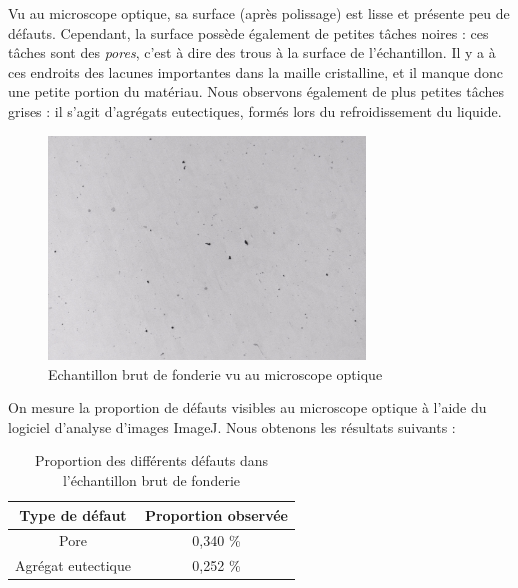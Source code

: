 Vu au microscope optique, sa surface (après polissage) est lisse
et présente peu de défauts. Cependant, la surface possède 
également de petites tâches noires : ces tâches sont des \emph{pores},
c'est à dire des trous à la surface de l'échantillon. Il y a à ces endroits 
des lacunes importantes dans la maille cristalline, et il manque donc 
une petite portion du matériau. Nous observons également de plus 
petites tâches grises : il s'agit d'agrégats eutectiques, formés lors du refroidissement du liquide.



\begin{figure}[htbp]
    \centering
    \includegraphics[width=0.75\textwidth]{images_optique/brut2.pdf}
    \caption{Echantillon brut de fonderie vu au microscope optique}
    \label{<label>}
\end{figure}

On mesure la proportion de défauts visibles au microscope optique à l'aide du 
logiciel d'analyse d'images ImageJ. Nous obtenons les résultats suivants : \\
\begin{table}
    \centering
    \caption{Proportion des différents défauts dans l'échantillon brut de fonderie}
    \begin{tabular}{c|c}
        \textbf{Type de défaut}  & \textbf{Proportion observée}  \\
        \hline
        Pore               & 0,340 \% \\
        Agrégat eutectique & 0,252 \% \\
    \end{tabular}

\end{table}

